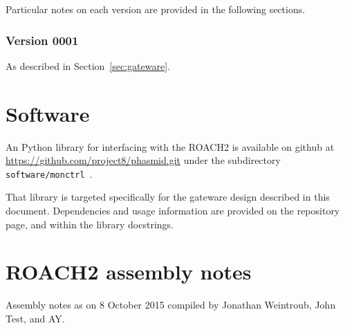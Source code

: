 \documentclass[a4paper,10pt]{article}
\newcommand{\ilcode}[1]{\begingroup
	\setlength{\fboxsep}{1pt}\colorbox{ilcodebg}{\small\tt%
		#1%
	}\endgroup}
\begin{document}
\noindent Particular notes on each version are provided in the following sections. 

\subsubsection*{Version 0001}
As described in Section~\ref{sec:gateware}.

\section{Software}
\label{sec:software}
An Python library for interfacing with the ROACH2 is available on github
at \url{https://github.com/project8/phasmid.git} under the subdirectory 
\ilcode{software/monctrl}.

That library is targeted specifically for the gateware design described 
in this document. Dependencies and usage information are provided on the 
repository page, and within the library docstrings.




\clearpage{}
\appendix
\section{ROACH2 assembly notes}
\label{sec:r2assy}
Assembly notes as on 8 October 2015 compiled by Jonathan Weintroub, John Test, and AY.


\end{document}
